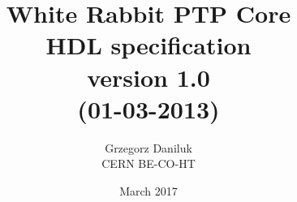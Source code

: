 \documentclass[a4paper]{article}
\begin{document}
\title{White Rabbit PTP Core \\ HDL specification\\\normalsize
{version 1.0}\\\small{(01-03-2013)}}
\author{Grzegorz Daniluk\\ CERN BE-CO-HT}

\date{March 2017}
\maketitle
\thispagestyle{empty}

\newpage

\tableofcontents

\newpage






\appendix


\end{document}
